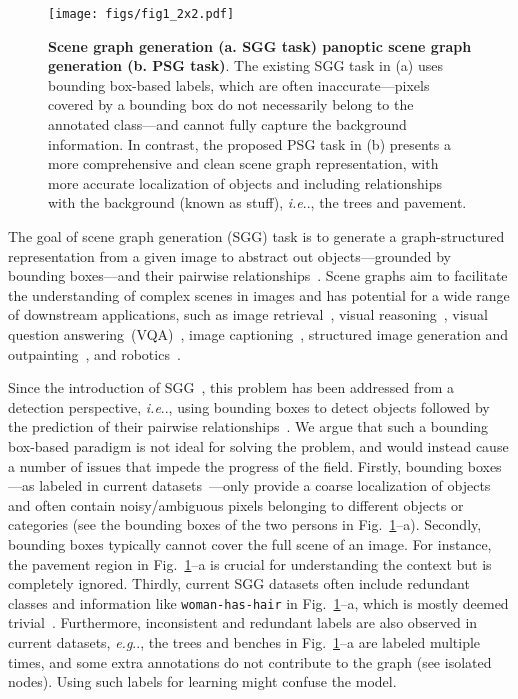 \documentclass[runningheads]{llncs}
\makeatletter
\newcommand{\subfig}[1]{\textcolor{linkcolor}{-#1}}
\DeclareRobustCommand\onedot{\futurelet\@let@token\@onedot}
\def\@onedot{\ifx\@let@token.\else.\null\fi\xspace}
\def\eg{\emph{e.g}\onedot} \def\Eg{\emph{E.g}\onedot}
\def\ie{\emph{i.e}\onedot} \def\Ie{\emph{I.e}\onedot}
\makeatother
\begin{document}
\begin{figure}[t]
    \centering
    \texttt{[image: figs/fig1\_2x2.pdf]}
    \caption{\textbf{Scene graph generation (a. SGG task) \vs panoptic scene graph generation (b. PSG task)}. The existing SGG task in (a) uses bounding box-based labels, which are often inaccurate---pixels covered by a bounding box do not necessarily belong to the annotated class---and cannot fully capture the background information. In contrast, the proposed PSG task in (b) presents a more comprehensive and clean scene graph representation, with more accurate localization of objects and including relationships with the background (known as stuff), \ie, the trees and pavement.
    }
    \label{fig:psg_vs_vg}
\end{figure} 
The goal of scene graph generation (SGG) task is to generate a graph-structured representation from a given image to abstract out objects---grounded by bounding boxes---and their pairwise relationships~\cite{sggsurvey21arxiv,sggsurvey20tnnls}. 
Scene graphs aim to facilitate the understanding of complex scenes in images and has potential for a wide range of downstream applications, such as image retrieval~\cite{johnson2015image,schuster2015generating,qi2017online}, visual reasoning~\cite{aditya2018image,shi2019explainable}, visual question answering~(VQA)~\cite{hildebrandt2020scene}, image captioning~\cite{gao2018image,chen2020say}, structured image generation and outpainting~\cite{johnson2018image,dhamo2020semantic,yang2022scene}, and robotics~\cite{gadre2022continuous,amiri2022reasoning}.

Since the introduction of SGG~\cite{johnson2015image}, this problem has been addressed from a detection perspective, \ie, using bounding boxes to detect objects followed by the prediction of their pairwise relationships~\cite{vg17ijcv,xu2017scene,liang2019vrr}. We argue that such a bounding box-based paradigm is not ideal for solving the problem, and would instead cause a number of issues that impede the progress of the field. Firstly, bounding boxes---as labeled in current datasets~\cite{vg17ijcv}---only provide a coarse localization of objects and often contain noisy/ambiguous pixels belonging to different objects or categories (see the bounding boxes of the two persons in Fig.~\ref{fig:psg_vs_vg}\subfig{-a}). Secondly, bounding boxes typically cannot cover the full scene of an image. For instance, the pavement region in Fig.~\ref{fig:psg_vs_vg}\subfig{-a} is crucial for understanding the context but is completely ignored. Thirdly, current SGG datasets often include redundant classes and information like \texttt{woman-has-hair} in Fig.~\ref{fig:psg_vs_vg}\subfig{-a}, which is mostly deemed trivial~\cite{liang2019vrr}. Furthermore, inconsistent and redundant labels are also observed in current datasets, \eg, the trees and benches in Fig.~\ref{fig:psg_vs_vg}\subfig{-a} are labeled multiple times, and some extra annotations do not contribute to the graph (see isolated nodes). Using such labels for learning might confuse the model.
\end{document}
